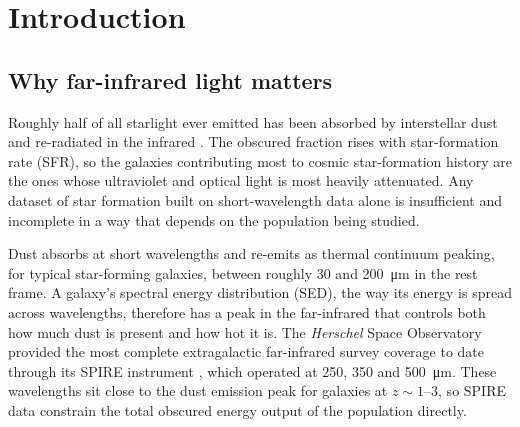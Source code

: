 \documentclass[12pt,a4paper]{article}
\begin{document}
\begin{abstract}
The matched-object test reveals a second weakness. At the conservative
$\mathrm{SNR}\geq5$ cut, median model fluxes are too faint by 0.20--\SI{0.31}{dex},
while the noise-deconvolved object-to-object scatter is 0.45--\SI{0.52}{dex}. Wang and
Jin agree with each other to only 0.12--\SI{0.15}{dex}, showing that deblending cannot
account for most of this spread. In a steep flux distribution, the model scatter moves
many more faint galaxies up into brighter bins than the opposite. A decomposition on the
wider $\mathrm{SNR}\geq3$ sample finds count inflation of 0.55--\SI{0.86}{dex}. It
accounts for the measured excess at \SI{250}{\um}, but leaves residual excesses of
0.20 and \SI{0.15}{dex} at 350 and \SI{500}{\um}, where the cold SED remains important.
The main suggestion is to keep the learned population and energy balance,
but introduce a galaxy-dependent FIR dust family and validate both population counts
and individual-object scatter on held-out survey fields.
\end{abstract}

\section{Introduction}
\label{sec:intro}

\subsection{Why far-infrared light matters}
\label{sec:intro:fir}

Roughly half of all starlight ever emitted has been absorbed by interstellar dust and
re-radiated in the infrared \citep{Dole_2006}. The
obscured fraction rises with star-formation rate (SFR), so the galaxies
contributing most to cosmic star-formation history are the ones whose ultraviolet and
optical light is most heavily attenuated. Any dataset of star formation built on
short-wavelength data alone is insufficient and incomplete in a way that depends on the
population being studied.

Dust absorbs at short wavelengths and re-emits as thermal continuum peaking, for
typical star-forming galaxies, between roughly 30 and \SI{200}{\um} in the rest frame.
A galaxy's spectral energy distribution (SED), the way its energy is spread across
wavelengths, therefore has a peak in the far-infrared that controls both how much dust
is present and how hot it is. The
\emph{Herschel} Space Observatory \citep{Pilbratt_2010} provided the most complete
extragalactic far-infrared survey coverage to date through its SPIRE instrument
\citep{Griffin_2010}, which operated at 250, 350 and \SI{500}{\um}. These
wavelengths sit close to the dust emission peak for galaxies at $z \sim 1$--$3$, so
SPIRE data constrain the total obscured energy output of the population directly.
\end{document}
